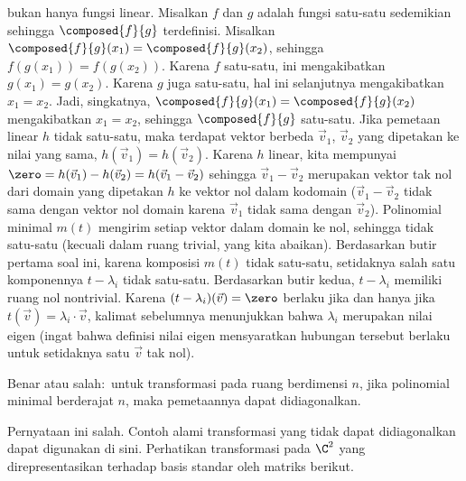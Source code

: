 \begin{exercises}
\begin{answer}
\begin{exparts}
{          bukan hanya fungsi linear.}
          Misalkan $f$ dan $g$ adalah fungsi satu-satu sedemikian sehingga
          $\composed{f}{g}$ terdefinisi.
          Misalkan $\composed{f}{g}(x_1)=\composed{f}{g}(x_2)$, sehingga
          $f(g(x_1))=f(g(x_2))$.
          Karena $f$ satu-satu, ini mengakibatkan $g(x_1)=g(x_2)$.
          Karena $g$ juga satu-satu, hal ini selanjutnya mengakibatkan
          $x_1=x_2$.
          Jadi, singkatnya, $\composed{f}{g}(x_1)=\composed{f}{g}(x_2)$
          mengakibatkan $x_1=x_2$, sehingga $\composed{f}{g}$ satu-satu.
        \partsitem Jika pemetaan linear $h$
          tidak satu-satu, maka terdapat vektor berbeda
          $\vec{v}_1$, $\vec{v}_2$ yang dipetakan ke nilai yang sama,
          $h(\vec{v}_1)=h(\vec{v}_2)$.
          Karena $h$ linear, kita mempunyai
          $\zero=h(\vec{v}_1)-h(\vec{v}_2)=h(\vec{v}_1-\vec{v}_2)$
          sehingga $\vec{v}_1-\vec{v}_2$ merupakan vektor tak nol dari domain
          yang dipetakan $h$ ke vektor nol dalam kodomain
          ($\vec{v}_1-\vec{v}_2$
          tidak sama dengan vektor nol domain karena $\vec{v}_1$
          tidak sama dengan $\vec{v}_2$).
        \partsitem Polinomial minimal
          $m(t)$ mengirim setiap vektor dalam domain ke
          nol, sehingga tidak satu-satu (kecuali dalam ruang trivial, yang
          kita abaikan).
          Berdasarkan butir pertama soal ini,
          karena komposisi $m(t)$ tidak satu-satu,
          setidaknya salah satu komponennya $t-\lambda_i$ tidak satu-satu.
          Berdasarkan butir kedua, $t-\lambda_i$ memiliki ruang nol nontrivial.
          Karena $(t-\lambda_i)(\vec{v})=\zero$ berlaku jika dan hanya jika
          $t(\vec{v})=\lambda_i\cdot\vec{v}$, kalimat sebelumnya menunjukkan bahwa
          $\lambda_i$ merupakan nilai eigen (ingat bahwa definisi
          nilai eigen mensyaratkan hubungan tersebut berlaku untuk setidaknya satu
          $\vec{v}$ tak nol).
      \end{exparts}
    \end{answer}
  \item 
    Benar atau salah:~untuk transformasi pada ruang berdimensi
    \( n \), jika polinomial minimal berderajat \( n \),
    maka pemetaannya dapat didiagonalkan.
    \begin{answer}
      Pernyataan ini salah.
      Contoh alami transformasi yang tidak dapat didiagonalkan dapat digunakan di sini.
      Perhatikan transformasi pada $\C^2$ yang direpresentasikan terhadap
      basis standar oleh matriks berikut.
      \begin{equation*}

\end{equation*}
\end{answer}
\end{exercises}
